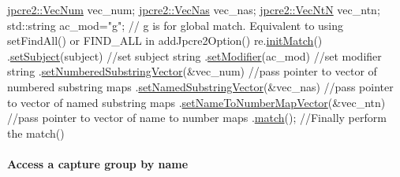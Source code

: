 \begin{DoxyCode}
\hyperlink{namespacejpcre2_ac1cf752c8fbb0be78020be3b80e77ce3}{jpcre2::VecNum} vec\_num;   
\hyperlink{namespacejpcre2_a2b121ae776ea5b2913839f418a7d856b}{jpcre2::VecNas} vec\_nas;   
\hyperlink{namespacejpcre2_a88a7aaf84cad627d34c8152e726168eb}{jpcre2::VecNtN} vec\_ntn;   
std::string ac\_mod=\textcolor{stringliteral}{"g"};   \textcolor{comment}{// g is for global match. Equivalent to using setFindAll() or FIND\_ALL in
       addJpcre2Option()}
re.\hyperlink{classjpcre2_1_1Regex_a519b0915bf1163c6ce6a4d674b30cfcd_a519b0915bf1163c6ce6a4d674b30cfcd}{initMatch}()
  .\hyperlink{classjpcre2_1_1RegexMatch_a635c652195deaa8ebb9e107c4f972aab_a635c652195deaa8ebb9e107c4f972aab}{setSubject}(subject)                         \textcolor{comment}{//set subject string}
  .\hyperlink{classjpcre2_1_1RegexMatch_a9df7e92f96b61553f62720cb8f5f23e5_a9df7e92f96b61553f62720cb8f5f23e5}{setModifier}(ac\_mod)                         \textcolor{comment}{//set modifier string}
  .\hyperlink{classjpcre2_1_1RegexMatch_a2c7efe1ec2e13827f670db4ecedcd0a0_a2c7efe1ec2e13827f670db4ecedcd0a0}{setNumberedSubstringVector}(&vec\_num)        \textcolor{comment}{//pass pointer to vector of
       numbered substring maps}
  .\hyperlink{classjpcre2_1_1RegexMatch_ae495431f57cae54363331237ab21b56c_ae495431f57cae54363331237ab21b56c}{setNamedSubstringVector}(&vec\_nas)           \textcolor{comment}{//pass pointer to vector of named
       substring maps}
  .\hyperlink{classjpcre2_1_1RegexMatch_a04926e61d8b5f1d8bdf344efecd567d8_a04926e61d8b5f1d8bdf344efecd567d8}{setNameToNumberMapVector}(&vec\_ntn)          \textcolor{comment}{//pass pointer to vector of name to
       number maps}
  .\hyperlink{classjpcre2_1_1RegexMatch_a5868aef3a146594ea1ebef34d122bb33_a5868aef3a146594ea1ebef34d122bb33}{match}();                                    \textcolor{comment}{//Finally perform the match()}
\end{DoxyCode}
\hypertarget{index_access-substring-by-name}{}\paragraph{Access a capture group by name}\label{index_access-substring-by-name}

